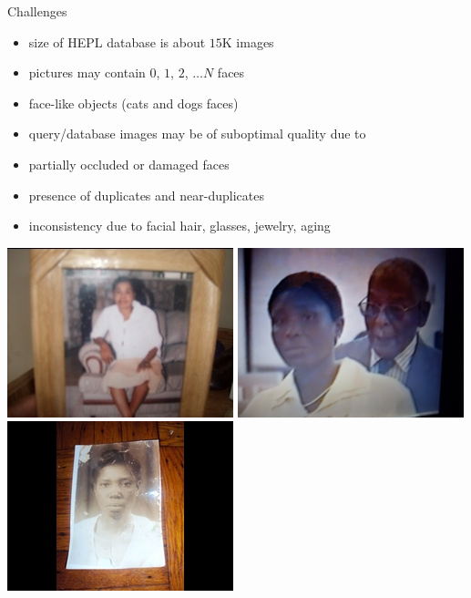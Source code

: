 \begin{xpsectionbox}{Challenges}{}

\begin{minipage}{0.45\linewidth}
\begin{itemize}
	\item size of HEPL database is about $15$K images
	\item pictures may contain $0$, $1$, $2$, $\ldots N$ faces
	\item face-like objects (cats and dogs faces)
	\item query/database images may be of suboptimal quality due to
	\item partially occluded or damaged faces
	\item presence of duplicates and near-duplicates
	\item inconsistency due to facial hair, glasses, jewelry, aging
\end{itemize}
\end{minipage}
\begin{minipage}{0.55\linewidth}
\begin{center}

			\vspace{-1cm}
			
			\includegraphics[height=0.22\linewidth]{images/PL_low_quality}
			\includegraphics[height=0.22\linewidth]{images/HEPL_low_quality}
			\includegraphics[height=0.22\linewidth]{images/HEPL_picture_photo}

			\vspace{0.2cm}			
			

\end{center}
\end{minipage}
\end{xpsectionbox}
